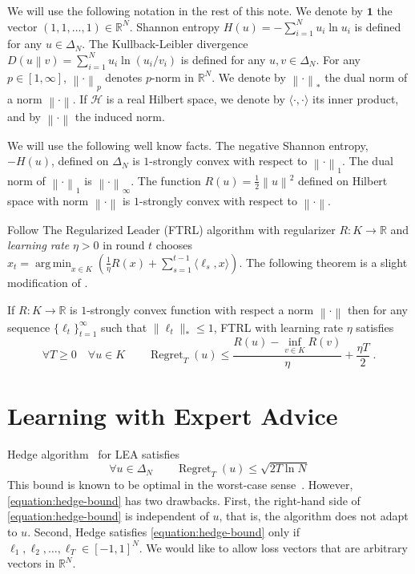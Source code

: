 \documentclass{colt2016} %
\DeclareMathOperator{\Regret}{Regret}
\newcommand{\R}{\mathbb{R}}     %
\renewcommand{\H}{\mathcal{H}}  %
\newcommand{\KL}[2]{D\left({#1}\middle\|{#2}\right)}  %
\newcommand{\norm}[1]{\left\|{#1}\right\|}
\DeclareMathOperator*{\argmin}{arg\,min}
\newcommand{\indicator}{\mathbf{1}}
\begin{document}
We will use the following notation in the rest of this note. We denote by
$\indicator$ the vector $(1,1,\dots,1) \in \R^N$. Shannon entropy $H(u) =
-\sum_{i=1}^N u_i \ln u_i$ is defined for any $u \in \Delta_N$.  The
Kullback-Leibler divergence $\KL{u}{v} = \sum_{i=1}^N u_i \ln(u_i/v_i)$ is
defined for any $u,v \in \Delta_N$. For any $p \in [1,\infty]$,
$\norm{\cdot}_p$ denotes $p$-norm in $\R^N$.  We denote by $\norm{\cdot}_*$ the
dual norm of a norm $\norm{\cdot}$.  If $\H$ is a real Hilbert space, we denote
by $\langle \cdot, \cdot \rangle$ its inner product, and by $\norm{\cdot}$ the
induced norm.

We will use the following well know facts. The negative Shannon entropy, $-H(u)$,
defined on $\Delta_N$ is $1$-strongly convex with respect to $\norm{\cdot}_1$.
The dual norm of $\norm{\cdot}_1$ is $\norm{\cdot}_\infty$.  The function $R(u)
= \frac{1}{2}\norm{u}^2$ defined on Hilbert space with norm $\norm{\cdot}$ is
$1$-strongly convex with respect to $\norm{\cdot}$.

Follow The Regularized Leader (FTRL) algorithm with regularizer $R:K \to \R$
and \emph{learning rate} $\eta > 0$ in round $t$ chooses
$
x_t = \argmin_{x \in K} \left( \frac{1}{\eta} R(x) + \sum_{s=1}^{t-1} \langle \ell_s, x \rangle \right)
$.
The following theorem is a slight modification of \citet[Theorem 2.11]{Shalev-Shwartz-2011}.
\begin{theorem}
\label{theorem:ftrl-regret}
If $R:K \to \R$ is $1$-strongly convex function with respect a norm
$\norm{\cdot}$ then for any sequence $\{\ell_t\}_{t=1}^\infty$ such that
$\|\ell_t\|_* \le 1$, FTRL with learning rate $\eta$ satisfies
$$
\forall T \ge 0 \quad \forall u \in K \qquad \Regret_T(u) \le \frac{R(u) - \inf_{v \in K} R(v)}{\eta} + \frac{\eta T}{2} \; .
$$
\end{theorem}

\section{Learning with Expert Advice}

Hedge algorithm~\citep{Freund-Schapire-1997} for LEA satisfies
\begin{equation}
\label{equation:hedge-bound}
\forall u \in \Delta_N \qquad \Regret_T(u) \le \sqrt{2 T \ln N}
\end{equation}
This bound is known to be optimal in the worst-case sense~\cite[Section
3.7]{Cesa-Bianchi-Lugosi-2006}. However, \eqref{equation:hedge-bound} has two
drawbacks.  First, the right-hand side of \eqref{equation:hedge-bound} is
independent of $u$, that is, the algorithm does not adapt to $u$.
Second, Hedge satisfies \eqref{equation:hedge-bound} only if $\ell_1, \ell_2,
\dots, \ell_T \in [-1,1]^N$. We would like to allow loss vectors that are
arbitrary vectors in $\R^N$.
\end{document}
